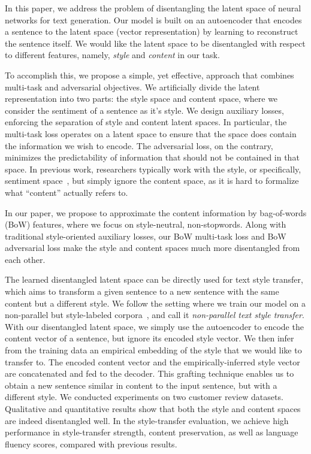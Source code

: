 \documentclass[11pt,a4paper]{article}
\begin{document}
In this paper, we address the problem of disentangling the latent space of neural networks for text generation.
Our model is built on an autoencoder that encodes a sentence to the latent space (vector representation) by learning to reconstruct the sentence itself.
We would like the latent space to be disentangled with respect to different features, namely, \textit{style} and \textit{content} in our task.

To accomplish this, we propose a simple, yet effective, approach that combines multi-task and adversarial objectives.
We artificially divide the latent representation into two parts: the style space and content space, where we consider the sentiment of a sentence as it's style.
We design auxiliary losses, enforcing the separation of style and content latent spaces.
In particular, the multi-task loss operates on a latent space to ensure that the space does contain the information we wish to encode.
The adversarial loss, on the contrary, minimizes the predictability of information that should not be contained in that space.
In previous work, researchers typically work with the style, or specifically, sentiment space~\cite{hu2017toward,shen2017style,fu2018style}, but simply ignore the content space, as it is hard to formalize what ``content'' actually refers to.

In our paper, we propose to approximate the content information by bag-of-words (BoW) features, where we focus on style-neutral, non-stopwords.
Along with traditional style-oriented auxiliary losses, our BoW multi-task loss and BoW adversarial loss make the style and content spaces much more disentangled from each other.

The learned disentangled latent space can be directly used for text style transfer, which aims to transform a given sentence to a new sentence with the same content but a different style.
We follow the setting where we train our model on a non-parallel but style-labeled corpora~\cite{hu2017toward,shen2017style}, and call it \textit{non-parallel text style transfer}.
With our disentangled latent space, we simply use the autoencoder to encode the content vector of a sentence, but ignore its encoded style vector.
We then infer from the training data an empirical embedding of the style that we would like to transfer to.
The encoded content vector and the empirically-inferred style vector are concatenated and fed to the decoder.
This grafting technique enables us to obtain a new sentence similar in content to the input sentence, but with a different style.
We conducted experiments on two customer review datasets.
Qualitative and quantitative results show that both the style and content spaces are indeed disentangled well.
In the style-transfer evaluation, we achieve high performance in style-transfer strength, content preservation, as well as language fluency scores, compared with previous results.
\end{document}
